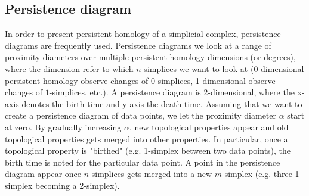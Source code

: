 \subsection{Persistence diagram}
\label{sec:persistence diagram}
In order to present persistent homology of a simplicial complex, persistence diagrams are frequently used. Persistence diagrams we look at a range of proximity diameters over multiple persistent homology dimensions (or degrees), where the dimension refer to which $n$-simplices we want to look at (0-dimensional persistent homology observe changes of $0$-simplices, 1-dimensional observe changes of $1$-simplices, etc.). A persistence diagram is 2-dimensional, where the x-axis denotes the birth time and y-axis the death time. Assuming that we want to create a persistence diagram of data points, we let the proximity diameter $\alpha$ start at zero. By gradually increasing $\alpha$, new topological properties appear and old topological properties gets merged into other properties. In particular, once a topological property is "birthed" (e.g. 1-simplex between two data points), the birth time is noted for the particular data point. A point in the persistence diagram appear once $n$-simplices gets merged into a new $m$-simplex (e.g. three 1-simplex becoming a 2-simplex).

